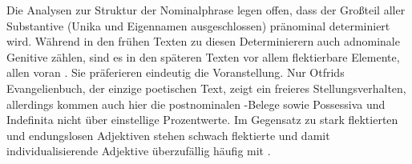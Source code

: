 Die Analysen zur Struktur der Nominalphrase legen offen, dass der Großteil aller Substantive (Unika und Eigennamen ausgeschlossen) pränominal determiniert wird. Während in den frühen Texten zu diesen Determinierern auch adnominale Genitive zählen, sind es in den späteren Texten vor allem flektierbare Elemente, allen voran . Sie präferieren eindeutig die Voranstellung. Nur Otfrids Evangelienbuch, der einzige poetischen Text, zeigt ein freieres Stellungsverhalten, allerdings kommen auch hier die postnominalen -Belege sowie Possessiva und Indefinita nicht über einstellige Prozentwerte. Im Gegensatz zu stark flektierten und endungslosen Adjektiven stehen schwach flektierte und damit individualisierende Adjektive überzufällig häufig mit .
